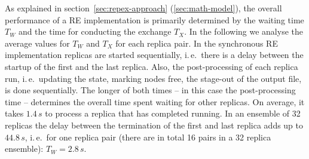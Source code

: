 \documentclass{rspublic}
\newcommand{\jhanote}[1]{ {\textcolor{red} { ***shantenu: #1 }}}
\newcommand{\alnote}[1]{ {\textcolor{blue} { ***andre: #1 }}}
\newcommand{\athotanote}[1]{ {\textcolor{green} { ***athota: #1 }}}
\newcommand{\alnote}[1]{}
\newcommand{\athotanote}[1]{}
\newcommand{\jhanote}[1]{}
\begin{document}
As explained in section~\ref{sec:repex-approach}
(\ref{sec:math-model}), the overall performance of a RE implementation
is primarily determined by the waiting time $T_W$ and the time for
conducting the exchange $T_X$. In the following we analyse the average
values for $T_{W}$ and $T_X$ for each replica pair.  In the
synchronous RE implementation replicas are started sequentially,
i.\,e.\ there is a delay between the startup of the first and the last
replica. Also, the post-processing of each replica run, i.\,e.\
updating the state, marking nodes free, the stage-out of the output
file, is done sequentially.  The longer of both times -- in this case
the post-processing time -- determines the overall time spent waiting
for other replicas.  On average, it takes $1.4\,s$ to process a
replica that has completed running. In an ensemble of 32 replicas the
delay between the termination of the first and last replica adds up to
$44.8\,s$, i.\,e.\ for one replica pair (there are in total 16 pairs
in a 32 replica ensemble): $T_{W} = 2.8\,s$.





\end{document}
